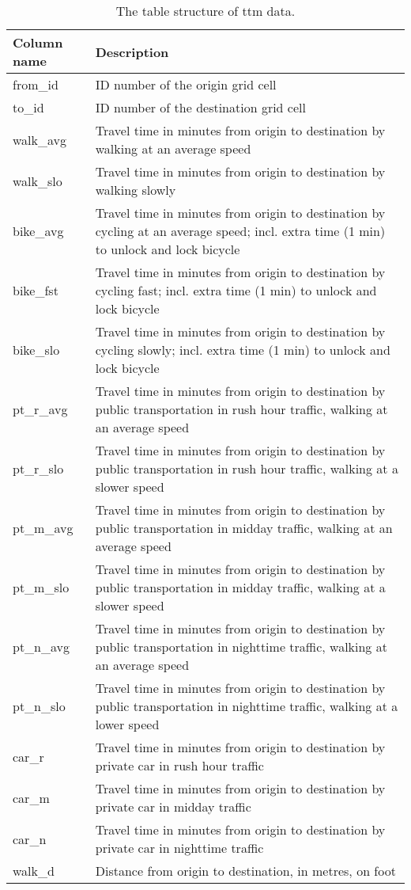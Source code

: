 \begin{table}[H]
	\caption{The table structure of \acrshort{ttm} data.}
	\label{tab:ttm table structure}
	\centering
	\begin{tabular}{ | L{0.15\textwidth} | L{0.75\textwidth} | }
		\hline
		\textbf{Column name}
		& \textbf{Description}
		\\
		\hline
		\hline
		from\_id
		& ID number of the origin grid cell
		\\
		\hline
		to\_id
		& ID number of the destination grid cell
		\\
		\hline
		walk\_avg
		& Travel time in minutes from origin to destination by walking at an average speed
		\\
		\hline
		walk\_slo
		& Travel time in minutes from origin to destination by walking slowly
		\\
		\hline
		bike\_avg
		& Travel time in minutes from origin to destination by cycling at an average speed; incl. extra time (1 min) to unlock and lock bicycle
		\\
		\hline
		bike\_fst
		& Travel time in minutes from origin to destination by cycling fast; incl. extra time (1 min) to unlock and lock bicycle
		\\
		\hline
		bike\_slo
		& Travel time in minutes from origin to destination by cycling slowly; incl. extra time (1 min) to unlock and lock bicycle
		\\
		\hline
		pt\_r\_avg
		& Travel time in minutes from origin to destination by public transportation in rush hour traffic, walking at an average speed
		\\
		\hline
		pt\_r\_slo
		& Travel time in minutes from origin to destination by public transportation in rush hour traffic, walking at a slower speed
		\\
		\hline
		pt\_m\_avg
		& Travel time in minutes from origin to destination by public transportation in midday traffic, walking at an average speed
		\\
		\hline
		pt\_m\_slo
		& Travel time in minutes from origin to destination by public transportation in midday traffic, walking at a slower speed
		\\
		\hline
		pt\_n\_avg
		& Travel time in minutes from origin to destination by public transportation in nighttime traffic, walking at an average speed
		\\
		\hline
		pt\_n\_slo
		& Travel time in minutes from origin to destination by public transportation in nighttime traffic, walking at a lower speed
		\\
		\hline
		car\_r
		& Travel time in minutes from origin to destination by private car in rush hour traffic
		\\
		\hline
		car\_m
		& Travel time in minutes from origin to destination by private car in midday traffic
		\\
		\hline
		car\_n
		& Travel time in minutes from origin to destination by private car in nighttime traffic
		\\
		\hline
		walk\_d
		& Distance from origin to destination, in metres, on foot
		\\
		\hline
	\end{tabular}
\end{table}
